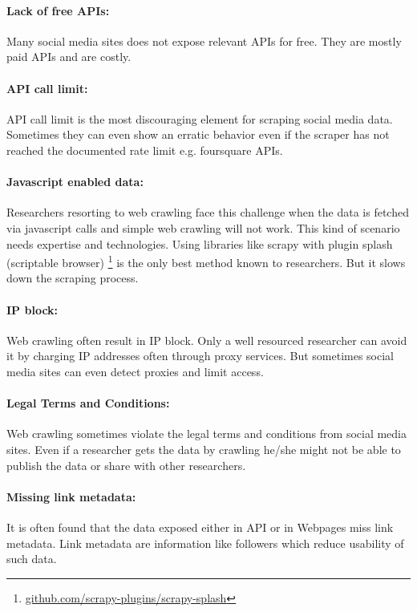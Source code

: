 \paragraph{Lack of free APIs:} Many social media sites does not expose relevant APIs for free. They are mostly paid APIs and are costly.

\paragraph{API call limit:} API call limit is the most discouraging element for scraping social media data. Sometimes they can even show an erratic behavior even if the scraper has not reached the documented rate limit e.g. foursquare APIs.

\paragraph{Javascript enabled data:}
Researchers resorting to web crawling face this challenge when the data is fetched via javascript calls and simple web crawling will not work. This kind of scenario needs expertise and technologies. Using libraries like scrapy with plugin splash (scriptable browser) \footnote{\href{https://github.com/scrapy-plugins/scrapy-splash}{github.com/scrapy-plugins/scrapy-splash}} is the only best method known to researchers. But it slows down the scraping process.

\paragraph{IP block:}
Web crawling often result in IP block. Only a well resourced researcher can avoid it by charging IP addresses often through proxy services. But sometimes social media sites can even detect proxies and limit access.

\paragraph{Legal Terms and Conditions:}
Web crawling sometimes violate the legal terms and conditions from social media sites. Even if a researcher gets the data by crawling he/she might not be able to publish the data or share with other researchers.

\paragraph{Missing link metadata: }
It is often found that the data exposed either in API or in Webpages miss link metadata. Link metadata are information like followers which reduce usability of such data.


